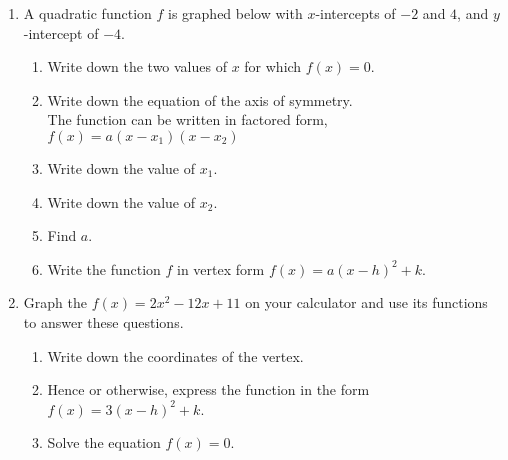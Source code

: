 \documentclass[12pt, twoside]{article}
\begin{document}
\begin{enumerate}%
\subsubsection*{5.4 Do Now: Graphing quadratic functions}
  \item A quadratic function $f$ is graphed below with $x$-intercepts of $-2$ and $4$, and $y$-intercept of $-4$.
    \begin{center}
    \end{center}
    \begin{enumerate}[itemsep=0.8cm]
      \item Write down the two values of $x$ for which $f(x)=0$.
      \item Write down the equation of the axis of symmetry. \\[1.5cm]
      The function can be written in factored form, $f(x)=a(x-x_1)(x-x_2)$
      \item Write down the value of $x_1$.
      \item Write down the value of $x_2$.
      \item Find $a$.
      \item Write the function $f$ in vertex form $f(x)=a(x-h)^2 +k$.
    \end{enumerate}

\newpage
\item Graph the $f(x)=2x^2-12x+11$ on your calculator and use its functions to answer these questions. 
\begin{enumerate}[itemsep=1cm]
    \item Write down the coordinates of the vertex.
    \item Hence or otherwise, express the function in the form $f(x)=3(x-h)^2 +k$.
    \item Solve the equation  $f(x)=0$.
\end{enumerate} \vspace{0.5cm}


\end{enumerate}
\end{document}
